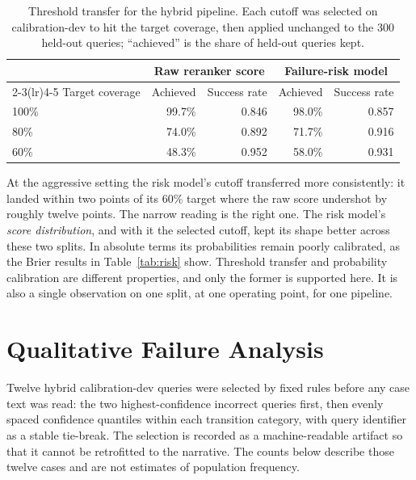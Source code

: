 \documentclass[11pt,a4paper]{article}
\begin{document}
\begin{table}[tbp]
\centering
\small
\caption{Threshold transfer for the hybrid pipeline. Each cutoff was selected on calibration-dev
to hit the target coverage, then applied unchanged to the 300 held-out queries; ``achieved'' is
the share of held-out queries kept.}
\label{tab:threshold}
\begin{tabular}{lrrrr}
\toprule
 & \multicolumn{2}{c}{Raw reranker score} & \multicolumn{2}{c}{Failure-risk model} \\
\cmidrule(lr){2-3}\cmidrule(lr){4-5}
Target coverage & Achieved & Success rate & Achieved & Success rate \\
\midrule
100\% & 99.7\% & 0.846 & 98.0\% & 0.857 \\
80\%  & 74.0\% & 0.892 & 71.7\% & 0.916 \\
60\%  & 48.3\% & 0.952 & 58.0\% & 0.931 \\
\bottomrule
\end{tabular}
\end{table}

At the aggressive setting the risk model's cutoff transferred more consistently: it landed
within two points of its 60\% target where the raw score undershot by roughly twelve points.
The narrow reading is the right one. The risk model's \emph{score distribution}, and with it the
selected cutoff, kept its shape better across these two splits. In absolute terms its
probabilities remain poorly calibrated, as the Brier results in Table~\ref{tab:risk} show.
Threshold
transfer and probability calibration are different properties, and only the former is supported
here. It is also a single observation on one split, at one operating point, for one pipeline.

\section{Qualitative Failure Analysis}
\label{sec:qualitative}

Twelve hybrid calibration-dev queries were selected by fixed rules before any case text was
read: the two highest-confidence incorrect queries first, then evenly spaced confidence
quantiles within each transition category, with query identifier as a stable tie-break. The
selection is recorded as a machine-readable artifact so that it cannot be retrofitted to the
narrative. The counts below describe those twelve cases and are not estimates of population
frequency.
\end{document}
